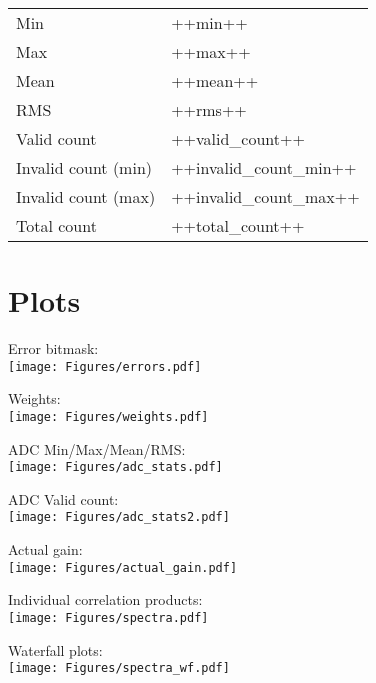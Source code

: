 \begin{tabular}{p{5cm}p{5cm}}
    Min & ++min++ \\
    Max & ++max++ \\
    Mean & ++mean++ \\
    RMS & ++rms++ \\
    Valid count & ++valid_count++ \\
    Invalid count (min) & ++invalid_count_min++ \\
    Invalid count (max) & ++invalid_count_max++ \\
    Total count & ++total_count++ \\
\end{tabular}




\section{Plots}

Error bitmask:\\
\texttt{[image: Figures/errors.pdf]}

Weights:\\
\texttt{[image: Figures/weights.pdf]}

ADC Min/Max/Mean/RMS:\\
\texttt{[image: Figures/adc\_stats.pdf]}

ADC Valid count:\\
\texttt{[image: Figures/adc\_stats2.pdf]}

Actual gain:\\
\texttt{[image: Figures/actual\_gain.pdf]}


Individual correlation products:\\
\texttt{[image: Figures/spectra.pdf]}

\newpage
Waterfall plots:\\
\texttt{[image: Figures/spectra\_wf.pdf]}


